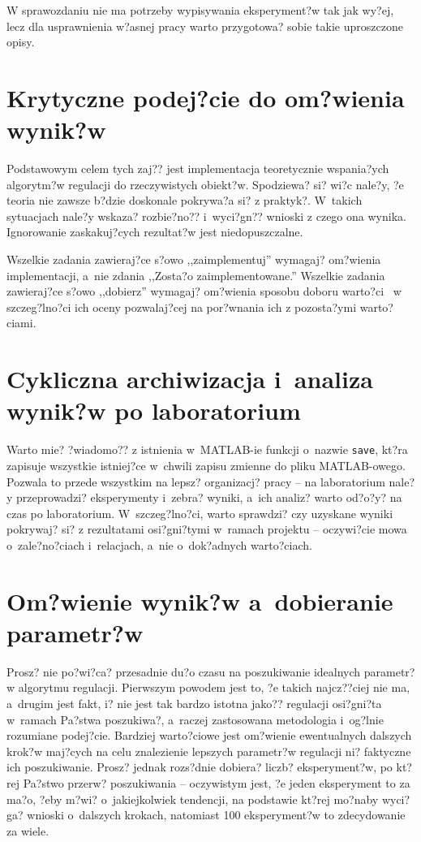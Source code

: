 W sprawozdaniu nie ma potrzeby wypisywania eksperyment?w tak jak wy?ej, lecz dla usprawnienia w?asnej pracy warto przygotowa? sobie takie uproszczone opisy.

\section{Krytyczne podej?cie do om?wienia wynik?w}
Podstawowym celem tych zaj?? jest implementacja teoretycznie wspania?ych algorytm?w regulacji do rzeczywistych obiekt?w. Spodziewa? si? wi?c nale?y, ?e teoria nie zawsze b?dzie doskonale pokrywa?a si? z praktyk?. W~takich sytuacjach nale?y wskaza? rozbie?no?? i~wyci?gn?? wnioski z czego ona wynika. Ignorowanie zaskakuj?cych rezultat?w jest niedopuszczalne.

Wszelkie zadania zawieraj?ce s?owo ,,zaimplementuj'' wymagaj? om?wienia implementacji, a~nie zdania ,,Zosta?o zaimplementowane.'' Wszelkie zadania zawieraj?ce s?owo ,,dobierz'' wymagaj? om?wienia sposobu doboru warto?ci ~w szczeg?lno?ci ich oceny pozwalaj?cej na por?wnania ich z pozosta?ymi warto?ciami.

\section{Cykliczna archiwizacja i~analiza wynik?w po laboratorium}
Warto mie? ?wiadomo?? z istnienia w~MATLAB-ie funkcji o~nazwie \verb+save+, kt?ra zapisuje wszystkie istniej?ce w~chwili zapisu zmienne do pliku MATLAB-owego. Pozwala to przede wszystkim na lepsz? organizacj? pracy -- na laboratorium nale?y przeprowadzi? eksperymenty i~zebra? wyniki, a~ich analiz? warto od?o?y? na czas po laboratorium. W~szczeg?lno?ci, warto sprawdzi? czy uzyskane wyniki pokrywaj? si? z rezultatami osi?gni?tymi w~ramach projektu -- oczywi?cie mowa o~zale?no?ciach i~relacjach, a~nie o~dok?adnych warto?ciach.

\section{Om?wienie wynik?w a~dobieranie parametr?w}
Prosz? nie po?wi?ca? przesadnie du?o czasu na poszukiwanie idealnych parametr?w algorytmu regulacji. Pierwszym powodem jest to, ?e takich najcz??ciej nie ma, a~drugim jest fakt, i? nie jest tak bardzo istotna jako?? regulacji osi?gni?ta w~ramach Pa?stwa poszukiwa?, a~raczej zastosowana metodologia i~og?lnie rozumiane podej?cie. Bardziej warto?ciowe jest om?wienie ewentualnych dalszych krok?w maj?cych na celu znalezienie lepszych parametr?w regulacji ni? faktyczne ich poszukiwanie. Prosz? jednak rozs?dnie dobiera? liczb? eksperyment?w, po kt?rej Pa?stwo przerw? poszukiwania -- oczywistym jest, ?e jeden eksperyment to za ma?o, ?eby m?wi? o~jakiejkolwiek tendencji, na podstawie kt?rej mo?naby wyci?ga? wnioski o~dalszych krokach, natomiast 100 eksperyment?w to zdecydowanie za wiele.

